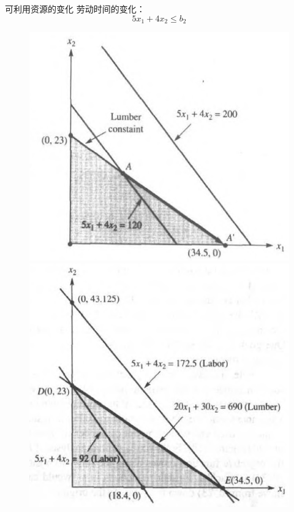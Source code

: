 \documentclass[UTF8]{ctexbeamer}
\begin{document}
\begin{frame}{可利用资源的变化}
  劳动时间的变化：
  \[
  5x_1 + 4x_2 \le b_2
  \]

  \begin{figure}
    \begin{minipage}{.5\linewidth}
      \includegraphics[width=\textwidth{}]{labor2.png}
    \end{minipage}%
    \begin{minipage}{.5\linewidth}
      \includegraphics[width=\textwidth{}]{labor3.png}
    \end{minipage}
  \end{figure}  

\end{frame}
\end{document}
